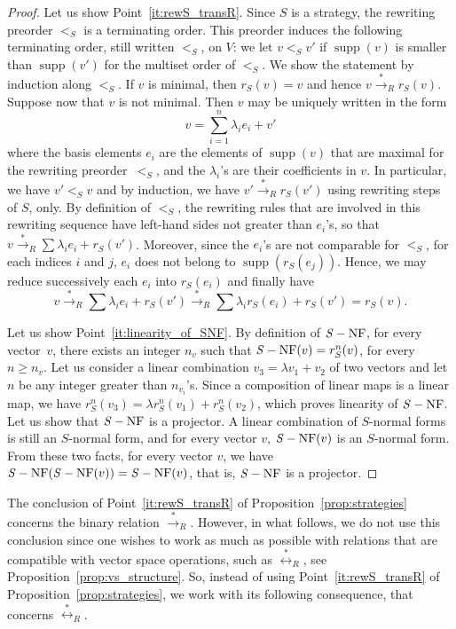 \documentclass[11pt]{article}
\theoremstyle{definition}
\newcommand\ordS{<_S}
\DeclareMathOperator{\supp}{supp}
\newcommand\transR{\overset{*}{\to}_R}
\newcommand\equivR{\overset{*}{\leftrightarrow}_R}
\DeclareMathOperator{\SNF}{{\it S}-NF}
\begin{document}
\begin{proof}
  Let us show Point~\ref{it:rewS_transR}. Since $S$ is a strategy, the
  rewriting preorder $\ordS$ is a terminating order. This preorder
  induces the following terminating order, still written $\ordS$, on $V$:
  we let $v\ordS v'$ if $\supp(v)$ is smaller than $\supp(v')$ for the
  multiset order of $\ordS$. We show the statement by induction along
  $\ordS$. If $v$ is minimal, then $r_S(v)=v$ and hence
  $v\transR r_S(v)$. Suppose now that $v$ is not minimal. Then $v$ may be
  uniquely written in the form
  \begin{equation}\label{equ:decompo_max}
    v=\sum_{i=1}^n\lambda_ie_i+v'
  \end{equation}
  where the basis elements $e_i$ are the elements of $\supp(v)$ that are
  maximal for the rewriting preorder~$\ordS$, and the $\lambda_i$'s are
  their coefficients in $v$. In particular, we have $v'\ordS v$ and by
  induction, we have $v'\transR r_S(v')$ using rewriting steps of $S$,
  only. By definition of $<_S$, the rewriting rules that are involved in
  this rewriting sequence have left-hand sides not greater than $e_i$'s,
  so that $v\transR\sum\lambda_ie_i+r_S(v')$. Moreover, since the $e_i$'s
  are not comparable for $\ordS$, for each indices $i$ and $j$, $e_i$
  does not belong to $\supp(r_S(e_j))$. Hence, we may reduce successively
  each $e_i$ into $r_S(e_i)$ and finally have
  \[
  v \transR
  \sum \lambda_ie_i+r_S(v') \transR
  \sum\lambda_ir_S(e_i) + r_S(v')
  =r_S(v).\]
    
  Let us show Point~\ref{it:linearity_of_SNF}. By definition of $\SNF$,
  for every vector~$v$, there exists an integer $n_v$ such that
  $\SNF(v)=r_S^n(v)$, for every $n\geq n_v$. Let us consider a linear
  combination $v_3=\lambda v_1+v_2$ of two vectors and let $n$ be any
  integer greater than $n_{v_i}$'s. Since a composition of linear maps is
  a linear map, we have $r_S^n(v_3)=\lambda r_S^n(v_1)+r_S^n(v_2)$, which
  proves linearity of $\SNF$. Let us show that $\SNF$ is a projector. A
  linear combination of $S$-normal forms is still an $S$-normal form, and
  for every vector $v$, $\SNF(v)$ is an $S$-normal form. From these two
  facts, for every vector $v$, we have $\SNF(\SNF(v))=\SNF(v)$, that is,
  $\SNF$ is a projector.
\end{proof}
\smallskip

The conclusion of Point~\ref{it:rewS_transR} of
Proposition~\ref{prop:strategies} concerns the binary relation $\transR$.
However, in what follows, we do not use this conclusion since one wishes
to work as much as possible with relations that are compatible with
vector space operations, such as $\equivR$, see
Proposition~\ref{prop:vs_structure}. So, instead of using
Point~\ref{it:rewS_transR} of Proposition~\ref{prop:strategies}, we work
with its following consequence, that concerns $\equivR$.
\smallskip
\end{document}
